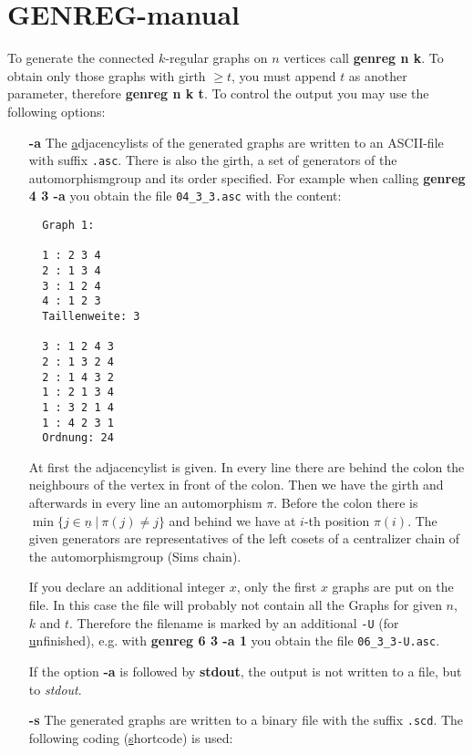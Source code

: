 \parindent=0cm
\setlength{\textwidth}{16.0cm}
\topmargin-0.5cm



\section*{GENREG-manual}

To generate the connected $k$-regular graphs on $n$ vertices
call {\bf genreg n k}. To obtain only those graphs with girth 
$\ge t$, you must append $t$ as another parameter, therefore
{\bf genreg n k t}. To control the output you may use the
following options:
\begin{itemize}
 \item[\bf -a]
  The \underline{a}djacencylists of the generated graphs are
  written to an ASCII-file with suffix \verb|.asc|. There is
  also the girth, a set of generators of the automorphismgroup
  and its order specified. For example when calling 
  {\bf genreg 4 3 -a} you obtain the file \verb|04_3_3.asc| with the content:
  \begin{verbatim}
  Graph 1:

  1 : 2 3 4
  2 : 1 3 4
  3 : 1 2 4
  4 : 1 2 3
  Taillenweite: 3

  3 : 1 2 4 3
  2 : 1 3 2 4
  2 : 1 4 3 2
  1 : 2 1 3 4
  1 : 3 2 1 4
  1 : 4 2 3 1
  Ordnung: 24 \end{verbatim}
  At first the adjacencylist is given. In every line there are
  behind the colon the neighbours of the vertex in front
  of the colon. Then we have the girth and afterwards in every
  line an automorphism $\pi$. Before the colon there is 
  $\min\{j \in \underline{n}\ |\ \pi(j)\not=j \}$ and behind
  we have at $i$-th position $\pi(i)$. The given generators
  are representatives of the left cosets of a centralizer chain of the 
  automorphismgroup (Sims chain).

  If you declare an additional integer $x$, only the first $x$
  graphs are put on the file. In this case the file will
  probably not contain all the Graphs for given $n$, $k$ and $t$.
  Therefore the filename is marked by an additional 
  \verb|-U| (for \underline{u}nfinished),
  e.g. with {\bf genreg 6 3 -a 1} you obtain the file
  \verb|06_3_3-U.asc|.

  If the option {\bf -a} is followed by {\bf stdout}, the output
  is not written to a file, but to {\em stdout}. 
 
 \item[\bf -s]
  The generated graphs are written to a binary file with the suffix
  \verb|.scd|. The following coding (\underline{s}hortcode) is used:


\end{itemize}

